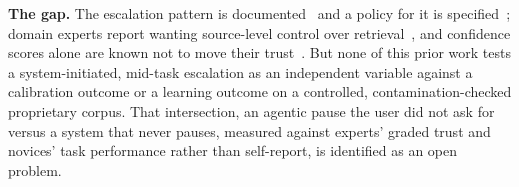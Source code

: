 \documentclass[sigconf,nonacm]{acmart}
\begin{document}
\textbf{The gap.} The escalation pattern is documented~\cite{mishra2026}
and a policy for it is specified~\cite{sanchezadame2026}; domain experts
report wanting source-level control over retrieval~\cite{ravi2025}, and
confidence scores alone are known not to move their trust~\cite{ravi2025}.
But none of this prior work tests a system-initiated, mid-task escalation
as an independent variable against a calibration outcome or a learning
outcome on a controlled, contamination-checked proprietary corpus. That
intersection, an agentic pause the user did not ask for versus a system
that never pauses, measured against experts' graded trust and novices'
task performance rather than self-report, is identified as an open problem.



\end{document}
